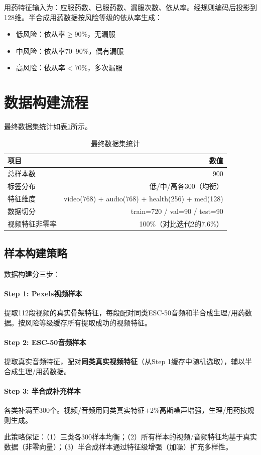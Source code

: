 用药特征输入为：应服药数、已服药数、漏服次数、依从率。经规则编码后投影到128维。半合成用药数据按风险等级的依从率生成：

\begin{itemize}
    \item 低风险：依从率$\geq$90\%，无漏服
    \item 中风险：依从率70--90\%，偶有漏服
    \item 高风险：依从率$<$70\%，多次漏服
\end{itemize}

\section{数据构建流程}

最终数据集统计如表\ref{tab:dataset_stats}所示。

\begin{table}[H]
\centering
\caption{最终数据集统计}
\label{tab:dataset_stats}
\begin{tabular}{lr}
\toprule
项目 & 数值 \\
\midrule
总样本数 & 900 \\
标签分布 & 低/中/高各300（均衡） \\
特征维度 & video(768) + audio(768) + health(256) + med(128) \\
数据切分 & train=720 / val=90 / test=90 \\
视频特征非零率 & 100\%（对比迭代2的7.6\%） \\
\bottomrule
\end{tabular}
\end{table}

\subsection{样本构建策略}

数据构建分三步：

\paragraph{Step 1: Pexels视频样本} 提取112段视频的真实骨架特征，每段配对同类ESC-50音频和半合成生理/用药数据。按风险等级缓存所有提取成功的视频特征。

\paragraph{Step 2: ESC-50音频样本} 提取真实音频特征，配对\textbf{同类真实视频特征}（从Step 1缓存中随机选取），辅以半合成生理/用药数据。

\paragraph{Step 3: 半合成补充样本} 各类补满至300个。视频/音频用同类真实特征$+$2\%高斯噪声增强，生理/用药按规则生成。

此策略保证：（1）三类各300样本均衡；（2）所有样本的视频/音频特征均基于真实数据（非零向量）；（3）半合成样本通过特征级增强（加噪）扩充多样性。
